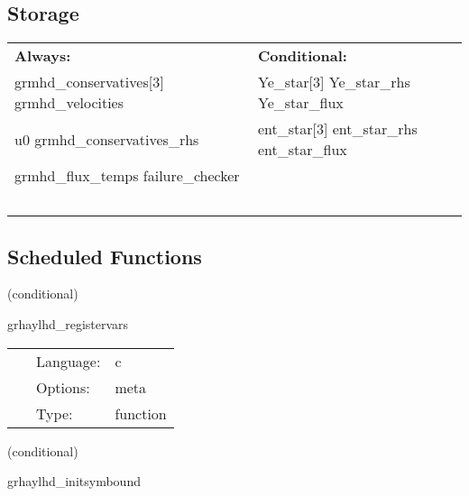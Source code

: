 \documentclass{article}
\begin{document}
\subsection*{Storage}

\hspace{5mm}

 \begin{tabular*}{160mm}{ll} 

{\bf Always:}& {\bf Conditional:} \\ 
 grmhd\_conservatives[3] grmhd\_velocities &  Ye\_star[3] Ye\_star\_rhs Ye\_star\_flux\\ 
 u0 grmhd\_conservatives\_rhs &  ent\_star[3] ent\_star\_rhs ent\_star\_flux\\ 
 grmhd\_flux\_temps failure\_checker & ~\\ 
~ & ~\\ 
\end{tabular*} 


\subsection*{Scheduled Functions}
\vspace{5mm}

   (conditional) 

\hspace{5mm} grhaylhd\_registervars 

\hspace{5mm}{\it register evolved, rhs variables in grhaylhd for mol } 


\hspace{5mm}

 \begin{tabular*}{160mm}{cll} 
~ & Language:  & c \\ 
~ & Options:  & meta \\ 
~ & Type:  & function \\ 
\end{tabular*} 


\vspace{5mm}

   (conditional) 

\hspace{5mm} grhaylhd\_initsymbound 

\hspace{5mm}{\it schedule symmetries } 


\hspace{5mm}
\end{document}

